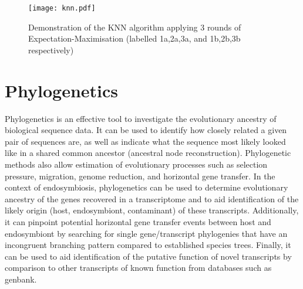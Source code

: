 \begin{figure}[h]
    \texttt{[image: knn.pdf]}
    \caption{Demonstration of the KNN algorithm applying 3 rounds of Expectation-Maximisation (labelled
    1a,2a,3a, and 1b,2b,3b respectively) }
    \label{fig:knn}
\end{figure}

%
%
% 
%
%
%







\section{Phylogenetics}


Phylogenetics is an effective tool to investigate the evolutionary ancestry of biological sequence data.
It can be used to identify how closely related a given pair of sequences are, as
well as indicate what the sequence most likely looked like in a shared common
ancestor (ancestral node reconstruction). Phylogenetic methods also allow estimation
of evolutionary processes such as selection pressure,
migration, genome reduction, and horizontal gene transfer.
In the context of endosymbiosis, phylogenetics can be used to determine evolutionary ancestry of 
the genes recovered in a transcriptome and to aid identification of the likely origin 
(host, endosymbiont, contaminant) of these transcripts. Additionally, it can pinpoint
potential horizontal gene transfer events between host and endosymbiont by searching for single 
gene/transcript phylogenies that have an incongruent branching pattern
compared to established species trees.  Finally, it can be used to aid identification of the putative function 
of novel transcripts by comparison to other transcripts of known function 
from databases such as genbank.


